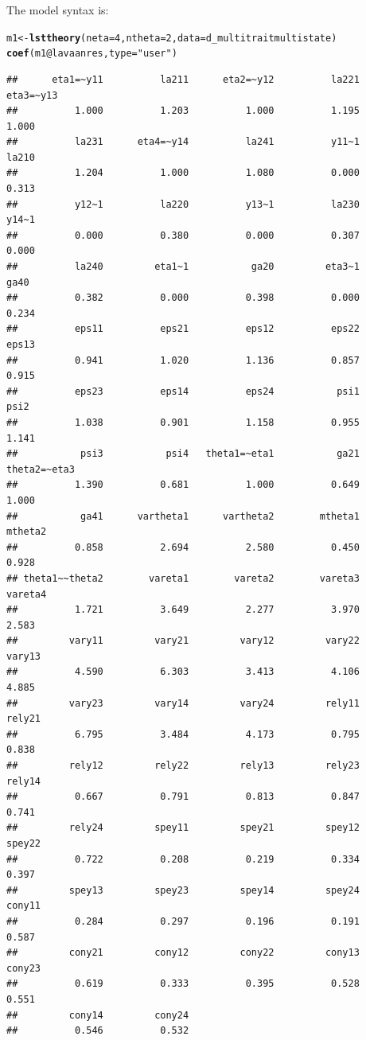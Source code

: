 \documentclass[10pt]{article}\usepackage[]{graphicx}\usepackage[]{xcolor}
\makeatletter
\newcommand{\hlnum}[1]{\textcolor[rgb]{0.686,0.059,0.569}{#1}}%
\newcommand{\hlstr}[1]{\textcolor[rgb]{0.192,0.494,0.8}{#1}}%
\newcommand{\hlopt}[1]{\textcolor[rgb]{0,0,0}{#1}}%
\newcommand{\hlstd}[1]{\textcolor[rgb]{0.345,0.345,0.345}{#1}}%
\newcommand{\hlkwb}[1]{\textcolor[rgb]{0.69,0.353,0.396}{#1}}%
\newcommand{\hlkwc}[1]{\textcolor[rgb]{0.333,0.667,0.333}{#1}}%
\newcommand{\hlkwd}[1]{\textcolor[rgb]{0.737,0.353,0.396}{\textbf{#1}}}%
\newenvironment{kframe}{%
 \def\at@end@of@kframe{}%
 \ifinner\ifhmode%
  \def\at@end@of@kframe{\end{minipage}}%
  \begin{minipage}{\columnwidth}%
 \fi\fi%
 \def\FrameCommand##1{\hskip\@totalleftmargin \hskip-\fboxsep
 \colorbox{shadecolor}{##1}\hskip-\fboxsep
     \hskip-\linewidth \hskip-\@totalleftmargin \hskip\columnwidth}%
 \MakeFramed {\advance\hsize-\width
   \@totalleftmargin\z@ \linewidth\hsize
   \@setminipage}}%
 {\par\unskip\endMakeFramed%
 \at@end@of@kframe}
\newenvironment{knitrout}{}{} %
\makeatother
\begin{document}
The model syntax is:

%
\begin{knitrout}
\color{fgcolor}\begin{kframe}
\begin{alltt}
\hlstd{m1} \hlkwb{<-} \hlkwd{lsttheory}\hlstd{(}\hlkwc{neta}\hlstd{=}\hlnum{4}\hlstd{,} \hlkwc{ntheta}\hlstd{=}\hlnum{2}\hlstd{,} \hlkwc{data}\hlstd{=d_multitraitmultistate)}
\hlkwd{coef}\hlstd{(m1}\hlopt{@}\hlkwc{lavaanres}\hlstd{,} \hlkwc{type}\hlstd{=}\hlstr{"user"}\hlstd{)}
\end{alltt}
\begin{verbatim}
##      eta1=~y11          la211      eta2=~y12          la221      eta3=~y13 
##          1.000          1.203          1.000          1.195          1.000 
##          la231      eta4=~y14          la241          y11~1          la210 
##          1.204          1.000          1.080          0.000          0.313 
##          y12~1          la220          y13~1          la230          y14~1 
##          0.000          0.380          0.000          0.307          0.000 
##          la240         eta1~1           ga20         eta3~1           ga40 
##          0.382          0.000          0.398          0.000          0.234 
##          eps11          eps21          eps12          eps22          eps13 
##          0.941          1.020          1.136          0.857          0.915 
##          eps23          eps14          eps24           psi1           psi2 
##          1.038          0.901          1.158          0.955          1.141 
##           psi3           psi4   theta1=~eta1           ga21   theta2=~eta3 
##          1.390          0.681          1.000          0.649          1.000 
##           ga41      vartheta1      vartheta2        mtheta1        mtheta2 
##          0.858          2.694          2.580          0.450          0.928 
## theta1~~theta2        vareta1        vareta2        vareta3        vareta4 
##          1.721          3.649          2.277          3.970          2.583 
##         vary11         vary21         vary12         vary22         vary13 
##          4.590          6.303          3.413          4.106          4.885 
##         vary23         vary14         vary24         rely11         rely21 
##          6.795          3.484          4.173          0.795          0.838 
##         rely12         rely22         rely13         rely23         rely14 
##          0.667          0.791          0.813          0.847          0.741 
##         rely24         spey11         spey21         spey12         spey22 
##          0.722          0.208          0.219          0.334          0.397 
##         spey13         spey23         spey14         spey24         cony11 
##          0.284          0.297          0.196          0.191          0.587 
##         cony21         cony12         cony22         cony13         cony23 
##          0.619          0.333          0.395          0.528          0.551 
##         cony14         cony24 
##          0.546          0.532
\end{verbatim}
\end{kframe}
\end{knitrout}
%
\end{document}
